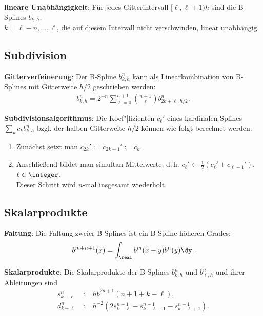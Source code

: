 \textbf{lineare Unabhängigkeit}:
Für jedes Gitterintervall $[\ell, \ell + 1)h$ sind die B-Splines $b_{k,h}$,\\
$k = \ell - n, \dotsc, \ell$, die auf diesem Intervall nicht verschwinden,
linear unabhängig.

\subsection{%
    Subdivision%
}

\textbf{Gitterverfeinerung}:
Der B-Spline $b_{k,h}^n$ kann als Linearkombination von B-Splines mit Gitterweite $h/2$
geschrieben werden:
\begin{align*}
    b_{k,h}^n = 2^{-n} \sum_{\ell=0}^{n+1} \binom{n+1}{\ell} b_{2k+\ell,h/2}^n.
\end{align*}

\textbf{Subdivisionsalgorithmus}:
Die Koef"|fizienten $c_\ell'$ eines kardinalen Splines $\sum_k c_k b_{k,h}^n$ bzgl. der halben
Gitterweite $h/2$ können wie folgt berechnet werden:
\begin{enumerate}
    \item
    Zunächst setzt man $c_{2k}' := c_{2k+1}' := c_k$.

    \item
    Anschließend bildet man simultan Mittelwerte, d.\,h.
    $c_\ell' \leftarrow \frac{1}{2} (c_\ell' + c_{\ell-1}')$, $\ell \in \integer$.\\
    Dieser Schritt wird $n$-mal insgesamt wiederholt.
\end{enumerate}

\pagebreak

\subsection{%
    Skalarprodukte%
}

\textbf{Faltung}:
Die Faltung zweier B-Splines ist ein B-Spline höheren Grades:
\begin{align*}
    b^{m+n+1}(x) = \int_\real b^m(x - y) b^n(y) \dy.
\end{align*}

\textbf{Skalarprodukte}:
Die Skalarprodukte der B-Splines $b_{k,h}^n$ und $b_{\ell,h}^n$ und ihrer Ableitungen sind
\begin{align*}
    s_{k-\ell}^n &:= h b^{2n+1} (n + 1 + k - \ell),\\
    d_{k-\ell}^n &:= h^{-2} (2s_{k-\ell}^{n-1} - s_{k-\ell-1}^{n-1} - s_{k-\ell+1}^{n-1}).
\end{align*}

